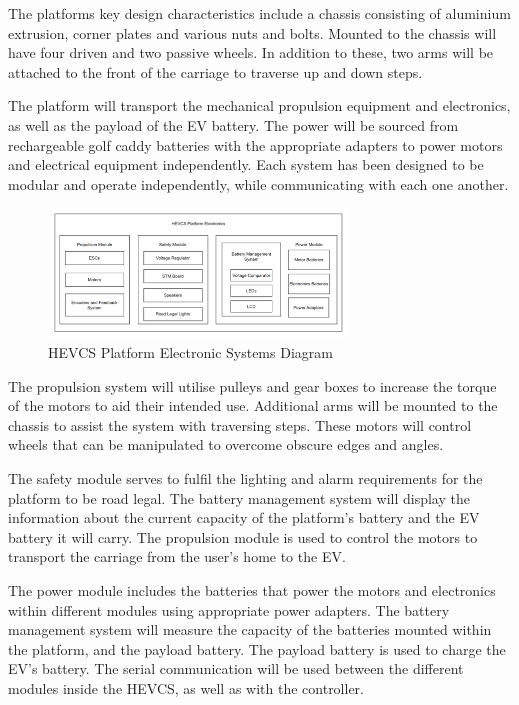 \documentclass [12pt]{article}
\begin{document}
The platforms key design characteristics include a chassis consisting of aluminium extrusion, corner plates and various nuts and bolts. Mounted to the chassis will have four driven and two passive wheels. In addition to these, two arms will be attached to the front of the carriage to traverse up and down steps. 

The platform will transport the mechanical propulsion equipment and electronics, as well as the payload of the EV battery. The power will be sourced from rechargeable golf caddy batteries with the appropriate adapters to power motors and electrical equipment independently. Each system has been designed to be modular and operate independently, while communicating with each one another. 

\begin{figure}[h]
    \centering
    \includegraphics[width = 8cm]{PlatformHardware.png}
    \caption{HEVCS Platform Electronic Systems Diagram}
\end{figure}

The propulsion system will utilise pulleys and gear boxes to increase the torque of the motors to aid their intended use. Additional arms will be mounted to the chassis to assist the system with traversing steps. These motors will control wheels that can be manipulated to overcome obscure edges and angles.

The safety module serves to fulfil the lighting and alarm requirements for the platform to be road legal. The battery management system will display the information about the current capacity of the platform’s battery and the EV battery it will carry. The propulsion module is used to control the motors to transport the carriage from the user’s home to the EV.

The power module includes the batteries that power the motors and electronics within different modules using appropriate power adapters. The battery management system will measure the capacity of the batteries mounted within the platform, and the payload battery. The payload battery is used to charge the EV’s battery. The serial communication will be used between the different modules inside the HEVCS, as well as with the controller. 
\end{document}
